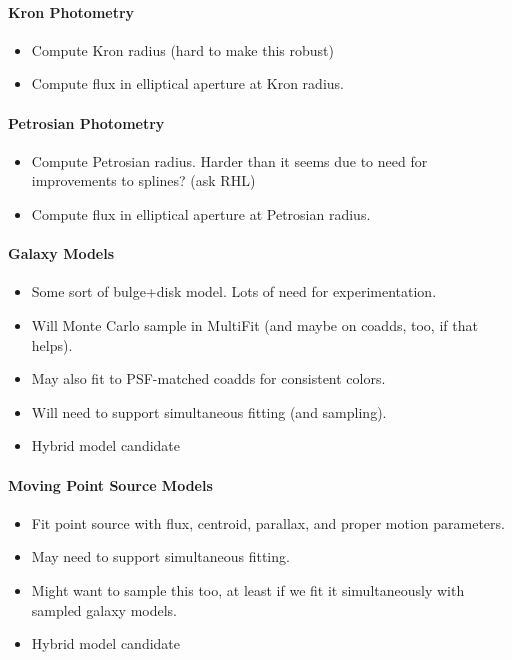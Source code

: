 \paragraph{Kron Photometry}
\label{sec:acKronPhotometry}
\begin{itemize}
\item Compute Kron radius (hard to make this robust)
\item Compute flux in elliptical aperture at Kron radius.
\end{itemize}

\paragraph{Petrosian Photometry}
\label{sec:acPetrosianPhotometry}
\begin{itemize}
\item Compute Petrosian radius.  Harder than it seems due to need for improvements to splines? (ask RHL)
\item Compute flux in elliptical aperture at Petrosian radius.
\end{itemize}

\paragraph{Galaxy Models}
\label{sec:acGalaxyModels}
\begin{itemize}
\item Some sort of bulge+disk model.  Lots of need for experimentation.
\item Will Monte Carlo sample in MultiFit (and maybe on coadds, too, if that helps).
\item May also fit to PSF-matched coadds for consistent colors.
\item Will need to support simultaneous fitting (and sampling).
\item Hybrid model candidate
\end{itemize}

\paragraph{Moving Point Source Models}
\label{sec:acMovingPointSourceModels}
\begin{itemize}
\item Fit point source with flux, centroid, parallax, and proper motion parameters.
\item May need to support simultaneous fitting.
\item Might want to sample this too, at least if we fit it simultaneously with sampled galaxy models.
\item Hybrid model candidate
\end{itemize}

